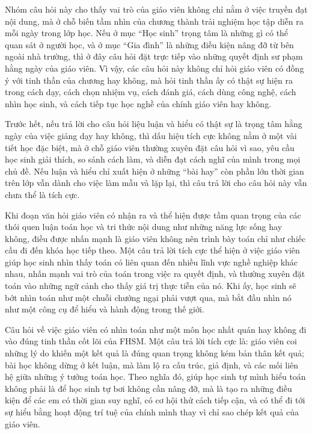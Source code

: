 \documentclass[
  10pt,
  a4paper,
  landscape,
  twoside,
  openany
]{scrbook}
\newcommand{\NOTE}[1]{#1}
\begin{document}
{
\NOTE{Nhóm câu hỏi này cho thấy vai trò của giáo viên không chỉ nằm ở việc truyền đạt nội dung, mà ở chỗ biến tầm nhìn của chương thành trải nghiệm học tập diễn ra mỗi ngày trong lớp học. Nếu ở mục “Học sinh” trọng tâm là những gì có thể quan sát ở người học, và ở mục “Gia đình” là những điều kiện nâng đỡ từ bên ngoài nhà trường, thì ở đây câu hỏi đặt trực tiếp vào những quyết định sư phạm hằng ngày của giáo viên. Vì vậy, các câu hỏi này không chỉ hỏi giáo viên có đồng ý với tinh thần của chương hay không, mà hỏi tinh thần ấy có thật sự hiện ra trong cách dạy, cách chọn nhiệm vụ, cách đánh giá, cách dùng công nghệ, cách nhìn học sinh, và cách tiếp tục học nghề của chính giáo viên hay không.

Trước hết, nếu trả lời cho câu hỏi liệu luận và hiểu có thật sự là trọng tâm hằng ngày của việc giảng dạy hay không, thì dấu hiệu tích cực không nằm ở một vài tiết học đặc biệt, mà ở chỗ giáo viên thường xuyên đặt câu hỏi vì sao, yêu cầu học sinh giải thích, so sánh cách làm, và diễn đạt cách nghĩ của mình trong mọi chủ đề. Nếu luận và hiểu chỉ xuất hiện ở những “bài hay” còn phần lớn thời gian trên lớp vẫn dành cho việc làm mẫu và lặp lại, thì câu trả lời cho câu hỏi này vẫn chưa thể là tích cực.

Khi đoạn văn hỏi giáo viên có nhận ra và thể hiện được tầm quan trọng của các thói quen luận toán học và tri thức nội dung như những năng lực sống hay không, điều được nhấn mạnh là giáo viên không nên trình bày toán chỉ như chiếc cầu đi đến khóa học tiếp theo. Một câu trả lời tích cực thể hiện ở việc giáo viên giúp học sinh nhìn thấy toán có liên quan đến nhiều lĩnh vực nghề nghiệp khác nhau, nhấn mạnh vai trò của toán trong việc ra quyết định, và thường xuyên đặt toán vào những ngữ cảnh cho thấy giá trị thực tiễn của nó. Khi ấy, học sinh sẽ bớt nhìn toán như một chuỗi chướng ngại phải vượt qua, mà bắt đầu nhìn nó như một công cụ để hiểu và hành động trong thế giới.

Câu hỏi về việc giáo viên có nhìn toán như một môn học nhất quán hay không đi vào đúng tinh thần cốt lõi của FHSM. Một câu trả lời tích cực là: giáo viên coi những lý do khiến một kết quả là đúng quan trọng không kém bản thân kết quả; bài học không dừng ở kết luận, mà làm lộ ra cấu trúc, giả định, và các mối liên hệ giữa những ý tưởng toán học. Theo nghĩa đó, giúp học sinh tự mình hiểu toán không phải là để học sinh tự bơi không cần nâng đỡ, mà là tạo ra những điều kiện để các em có thời gian suy nghĩ, có cơ hội thử cách tiếp cận, và có thể đi tới sự hiểu bằng hoạt động trí tuệ của chính mình thay vì chỉ sao chép kết quả của giáo viên.

}}
\end{document}
